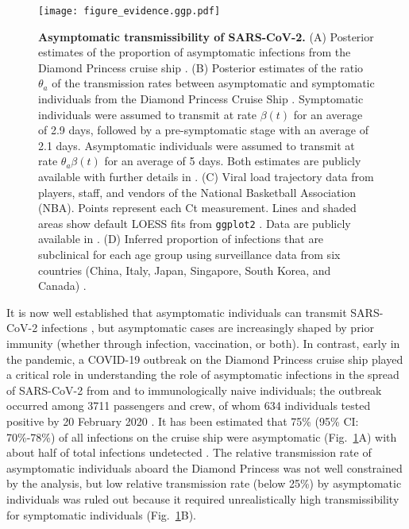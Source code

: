 \documentclass[12pt]{article}
\newcommand{\fref}[1]{Fig.~\ref{fig:#1}}
\begin{document}
\begin{figure}[!ht]
\texttt{[image: figure\_evidence.ggp.pdf]}
\caption{
\textbf{Asymptomatic transmissibility of SARS-CoV-2.}
(A) Posterior estimates of the proportion of asymptomatic infections from the Diamond Princess cruise ship \cite{emery2020}.
(B) Posterior estimates of the ratio $\theta_a$ of the transmission rates between asymptomatic and symptomatic individuals from the Diamond Princess Cruise Ship \cite{emery2020}.
Symptomatic individuals were assumed to transmit at rate $\beta(t)$ for an average of 2.9 days, followed by a pre-symptomatic stage with an average of 2.1 days. 
Asymptomatic individuals were assumed to transmit at rate $\theta_a \beta(t)$ for an average of 5 days.
Both estimates are publicly available with further details in \cite{emery2020}.
(C) Viral load trajectory data from players, staff, and vendors of the National Basketball Association (NBA).
Points represent each Ct measurement.
Lines and shaded areas show default LOESS fits from \texttt{ggplot2} \cite{ggplot2}.
Data are publicly available in \cite{Kissler2020}.
(D) Inferred proportion of infections that are subclinical for each age group using surveillance data from six countries (China, Italy, Japan, Singapore, South Korea, and Canada) \cite{davies2020}.
}
\label{fig:evidence}
\end{figure}

It is now well established that asymptomatic individuals can transmit SARS-CoV-2 infections \citep{gao2021role,johansson2021sars,subramanian2021quantifying,koelle2022changing,lizewski2022navy}, but asymptomatic cases are increasingly shaped by prior immunity (whether through infection, vaccination, or both).
In contrast, early in the pandemic, a COVID-19 outbreak on the Diamond Princess cruise ship played a critical role in understanding the role of asymptomatic infections in the spread of SARS-CoV-2 from and to immunologically naive individuals; the outbreak occurred among 3711 passengers and crew, of whom 634 individuals tested positive by 20 February 2020 \cite{mizumoto2020estimating}.
It has been estimated that 75\% (95\% CI: 70\%-78\%) of all infections on the cruise ship were asymptomatic (\fref{evidence}A) with about half of total infections undetected \cite{emery2020}.
The relative transmission rate of asymptomatic individuals aboard the Diamond Princess was not well constrained by the analysis, but low relative transmission rate (below 25\%) by asymptomatic individuals was ruled out because it required unrealistically high transmissibility for symptomatic individuals (\fref{evidence}B).
\end{document}
